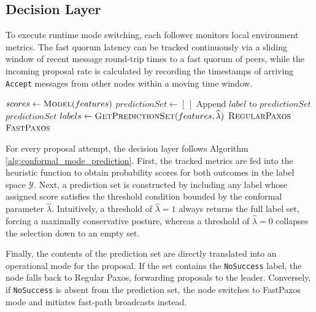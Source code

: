 \subsection{Decision Layer}
To execute runtime mode switching, each follower monitors local environment metrics. The fast quorum latency can be tracked continuously via a sliding window of recent message round-trip times to a fast quorum of peers, while the incoming proposal rate is calculated by recording the timestamps of arriving \texttt{Accept} messages from other nodes within a moving time window.

\begin{algorithm}[t]
    \caption{Conformal Mode Prediction}
    \label{alg:conformal_mode_prediction}
    \begin{algorithmic}[1]
            \State $scores \gets \textsc{Model}(features)$
            \State $predictionSet \gets [\ ]$
                    \State Append $label$ to $predictionSet$
                \EndIf
            \EndFor
            \State \Return $predictionSet$
        \EndProcedure
        \vspace{0.5em}
            \State $labels \gets \Call{GetPredictionSet}{features, \widehat{\lambda}}$
                \State \Return $\textsc{RegularPaxos}$
            \Else
                \State \Return $\textsc{FastPaxos}$
            \EndIf
        \EndProcedure
    \end{algorithmic}
\end{algorithm}

For every proposal attempt, the decision layer follows Algorithm \ref{alg:conformal_mode_prediction}. First, the tracked metrics are fed into the heuristic function to obtain probability scores for both outcomes in the label space $\mathcal{Y}$. Next, a prediction set is constructed by including any label whose assigned score satisfies the threshold condition bounded by the conformal parameter $\widehat{\lambda}$. Intuitively, a threshold of $\widehat{\lambda} = 1$ always returns the full label set, forcing a maximally conservative posture, whereas a threshold of $\widehat{\lambda} = 0$ collapses the selection down to an empty set.

Finally, the contents of the prediction set are directly translated into an operational mode for the proposal. If the set contains the \texttt{NoSuccess} label, the node falls back to Regular Paxos, forwarding proposals to the leader. Conversely, if \texttt{NoSuccess} is absent from the prediction set, the node switches to FastPaxos mode and initiates fast-path broadcasts instead.

